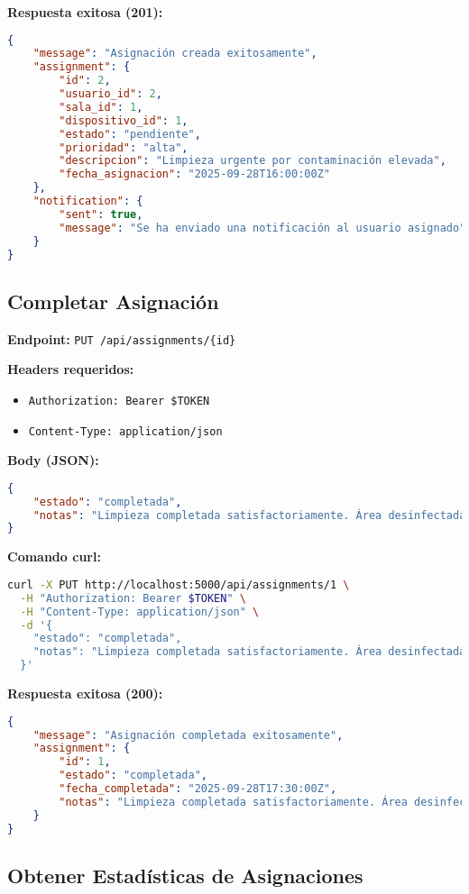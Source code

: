\documentclass[12pt,a4paper]{article}
\begin{document}
\textbf{Respuesta exitosa (201):}
\begin{lstlisting}[language=JSON]
{
    "message": "Asignación creada exitosamente",
    "assignment": {
        "id": 2,
        "usuario_id": 2,
        "sala_id": 1,
        "dispositivo_id": 1,
        "estado": "pendiente",
        "prioridad": "alta",
        "descripcion": "Limpieza urgente por contaminación elevada",
        "fecha_asignacion": "2025-09-28T16:00:00Z"
    },
    "notification": {
        "sent": true,
        "message": "Se ha enviado una notificación al usuario asignado"
    }
}
\end{lstlisting}

\subsection{Completar Asignación}

\textbf{Endpoint:} \texttt{PUT /api/assignments/\{id\}}

\textbf{Headers requeridos:}
\begin{itemize}
\item \texttt{Authorization: Bearer \$TOKEN}
\item \texttt{Content-Type: application/json}
\end{itemize}

\textbf{Body (JSON):}
\begin{lstlisting}[language=JSON]
{
    "estado": "completada",
    "notas": "Limpieza completada satisfactoriamente. Área desinfectada."
}
\end{lstlisting}

\textbf{Comando curl:}
\begin{lstlisting}[language=bash]
curl -X PUT http://localhost:5000/api/assignments/1 \
  -H "Authorization: Bearer $TOKEN" \
  -H "Content-Type: application/json" \
  -d '{
    "estado": "completada",
    "notas": "Limpieza completada satisfactoriamente. Área desinfectada."
  }'
\end{lstlisting}

\textbf{Respuesta exitosa (200):}
\begin{lstlisting}[language=JSON]
{
    "message": "Asignación completada exitosamente",
    "assignment": {
        "id": 1,
        "estado": "completada",
        "fecha_completada": "2025-09-28T17:30:00Z",
        "notas": "Limpieza completada satisfactoriamente. Área desinfectada."
    }
}
\end{lstlisting}

\subsection{Obtener Estadísticas de Asignaciones}
\end{document}
